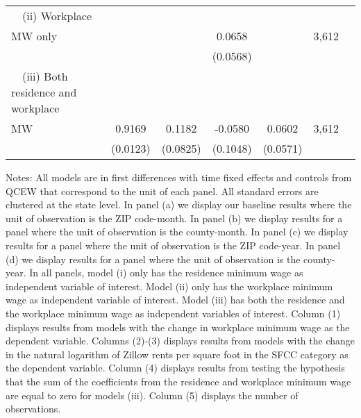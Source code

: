\begin{table}
\begin{tabular}{@{}lcccccc@{}}
        $\quad$(ii) Workplace \\MW only                      &       &       &  0.0658  &       & 3,612 \\
                                                             &       &       & (0.0568) &       &      \\
        $\quad$(iii) Both residence and workplace \\MW       &  0.9169  &  0.1182  &  -0.0580  &  0.0602  & 3,612 \\
                                                             & (0.0123) & (0.0825) & (0.1048) & (0.0571) &      \\ \bottomrule
    \end{tabular}

    \begin{minipage}{.95\textwidth} \footnotesize
        \vspace{2mm}
        Notes: All models are in first differences with time fixed effects and controls from QCEW that 
        correspond to the unit of each panel. All standard errors are clustered at the state level.
        In panel (a) we display our baseline results where the unit of observation is the ZIP code-month.
        In panel (b) we display results for a panel where the unit of observation is the county-month.
        In panel (c) we display results for a panel where the unit of observation is the ZIP code-year.
        In panel (d) we display results for a panel where the unit of observation is the county-year.
        In all panels, model (i) only has the residence minimum wage as independent variable of interest. 
        Model (ii) only has the workplace minimum wage as independent variable of interest.
        Model (iii) has both the residence and the workplace minimum wage as independent variables of interest.
        Column (1) displays results from models with the change in workplace minimum wage as the 
        dependent variable.
        Columns (2)-(3) displays results from models with the change in the natural logarithm of Zillow rents 
        per square foot in the SFCC category as the dependent variable. Column (4) displays results from
        testing the hypothesis that the sum of the coefficients from the residence and workplace minimum wage 
        are equal to zero for models (iii). Column (5) displays the number of observations. 

        
        
    \end{minipage}
\end{table}

